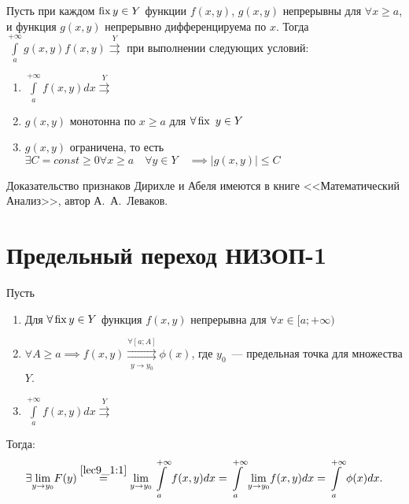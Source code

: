 \documentclass[../../main.tex]{subfiles}
\begin{document}
\begin{thm}

Пусть при каждом $\operatorname{fix} y \in Y$ функции $f(x,y)$, $g(x,y)$ непрерывны 
для $\forall x \ge a$, и функция $g(x, y)$ непрерывно дифференцируема по $x$.
Тогда $\int\limits_a^{+\infty} g(x,y) f(x,y) \overset{Y}{\rightrightarrows}$
при выполнении следующих условий:
\begin{enumerate}
	\item $\int\limits_a^{+\infty}f(x,y)dx \overset{Y}{\rightrightarrows}$
	\item $g(x, y)$ монотонна по $x \ge a$ для $\forall \operatorname{fix} \ y \in Y$
	\item $g(x,y)$ ограничена, то есть $\exists C = const \ge 0\forall x 
	\ge a \quad \forall y \in Y \quad \implies \left|g(x,y)\right| \le C $
\end{enumerate}
\end{thm}

Доказательство признаков Дирихле и Абеля имеются в книге <<Математический 
Анализ>>, автор А.~А.~Леваков.


\section{ Предельный переход НИЗОП-1}
\begin{thm}
Пусть

\begin{enumerate}
	\item Для $\forall \operatorname{fix}  y \in Y$ функция $f(x,y)$ непрерывна для $\forall x 
\in [a;+\infty)$
	\item $\forall A \ge a \implies f(x,y) 
\overset{\forall [a;A]}{\underset{y \to y_0}{\rightrightarrows}} \phi(x)$,
где $y_0$~--- предельная точка для множества $Y$.
	\item $\int\limits_a^{+\infty}f(x,y)dx \overset{Y}\rightrightarrows$
\end{enumerate}
Тогда:
\begin{equation}\label{lec10:12}
\exists \underset{y \to y_0}\lim F(y) \stk{lec9_1:1}= \underset{y \to 
y_0}\lim\int\limits_a^{+\infty}f(x,y)dx =\int\limits_a^{+\infty} \underset{y 
\to y_0}\lim f(x,y)dx = \int\limits_a^{+\infty}\phi(x)dx. \end{equation}
\end{thm}
\end{document}
